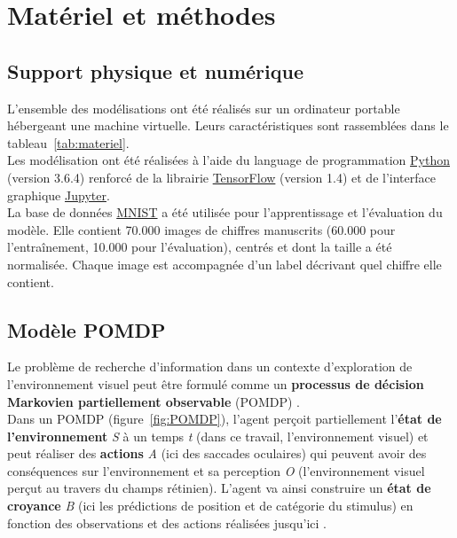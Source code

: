 
\chapter{Matériel et méthodes} %
\label{Materiel_methode} %


\section{Support physique et numérique} %
L'ensemble des modélisations ont été réalisés sur un ordinateur portable hébergeant une machine virtuelle. Leurs caractéristiques sont rassemblées dans le tableau~\ref{tab:materiel}.\\
Les modélisation ont été réalisées à l'aide du language de programmation \href{https://www.python.org/}{Python} (version 3.6.4) renforcé de la librairie \href{https://www.tensorflow.org/}{TensorFlow} (version 1.4) et de l'interface graphique \href{https://jupyter.org/}{Jupyter}.\\
La base de données \href{http://yann.lecun.com/exdb/mnist/}{MNIST} a été utilisée pour l'apprentissage et l'évaluation du modèle. Elle contient 70.000 images de chiffres manuscrits (60.000 pour l'entraînement, 10.000 pour l'évaluation), centrés et dont la taille a été normalisée. Chaque image est accompagnée d'un label décrivant quel chiffre elle contient.


\section{Modèle POMDP} %
Le problème de recherche d'information dans un contexte d'exploration de l'environnement visuel peut être formulé comme un \textbf{processus de décision Markovien partiellement observable} (POMDP) \autocite{Butko2010}. \\
Dans un POMDP (figure~\ref{fig:POMDP}), l'agent perçoit partiellement l'\textbf{état de l'environnement} \textit{S} à un temps \textit{t} (dans ce travail, l'environnement visuel) et peut réaliser des \textbf{actions} \textit{A} (ici des saccades oculaires) qui peuvent avoir des conséquences sur l'environnement et sa perception \textit{O} (l'environnement visuel perçut au travers du champs rétinien). L'agent va ainsi construire un \textbf{état de croyance} \textit{B} (ici les prédictions de position et de catégorie du stimulus) en fonction des observations et des actions réalisées jusqu'ici \autocite{Butko2010}.

